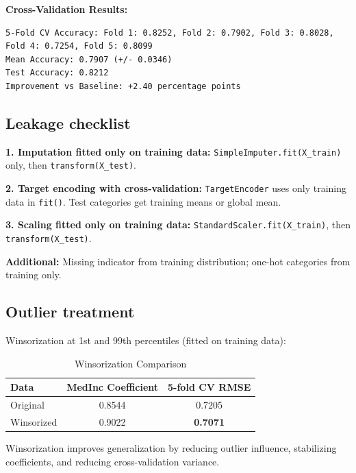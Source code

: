 \documentclass[12pt]{article}
\begin{document}
\textbf{Cross-Validation Results:}
\begin{lstlisting}
5-Fold CV Accuracy: Fold 1: 0.8252, Fold 2: 0.7902, Fold 3: 0.8028,
Fold 4: 0.7254, Fold 5: 0.8099
Mean Accuracy: 0.7907 (+/- 0.0346)
Test Accuracy: 0.8212
Improvement vs Baseline: +2.40 percentage points
\end{lstlisting}

\subsection{Leakage checklist}

\textbf{1. Imputation fitted only on training data:} \texttt{SimpleImputer.fit(X\_train)} only, then \texttt{transform(X\_test)}.

\textbf{2. Target encoding with cross-validation:} \texttt{TargetEncoder} uses only training data in \texttt{fit()}. Test categories get training means or global mean.

\textbf{3. Scaling fitted only on training data:} \texttt{StandardScaler.fit(X\_train)}, then \texttt{transform(X\_test)}.

\textbf{Additional:} Missing indicator from training distribution; one-hot categories from training only.

\subsection{Outlier treatment}

Winsorization at 1st and 99th percentiles (fitted on training data):

\begin{table}[H]
\centering
\small
\caption{Winsorization Comparison}
\begin{tabular}{l c c}
\toprule
\textbf{Data} & \textbf{MedInc Coefficient} & \textbf{5-fold CV RMSE} \\
\midrule
Original & 0.8544 & 0.7205 \\
Winsorized & 0.9022 & \textbf{0.7071} \\
\bottomrule
\end{tabular}
\end{table}

Winsorization improves generalization by reducing outlier influence, stabilizing coefficients, and reducing cross-validation variance.

\end{document}
